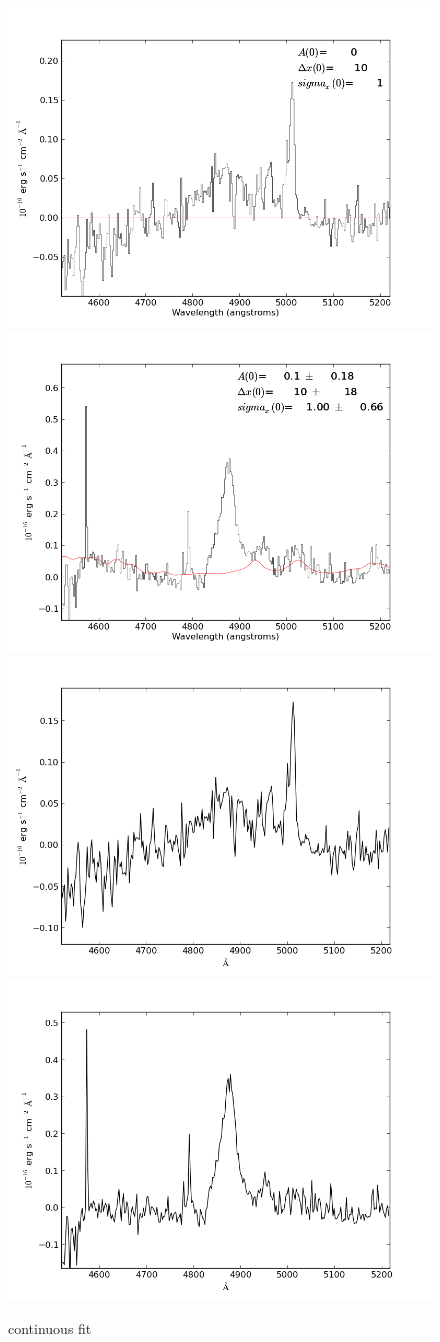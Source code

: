 \documentclass[usenatbib]{mn2e}
\begin{document}
\newpage

\begin{figure}
\begin{center}
\includegraphics[width=0.46\linewidth,angle=0]{fe_fit_Hbeta_8.png}
\vspace{5mm}
\includegraphics[width=0.49\linewidth,angle=0]{fe_fit_Hbeta_9.png}\\
\includegraphics[width=0.46\linewidth,angle=0]{fe_fit_Hbeta_res_8.png}
\hspace{5mm}
\includegraphics[width=0.49\linewidth,angle=0]{fe_fit_Hbeta_res_9.png}\\
\end{center} 
\caption{continuous fit \label{fig:landscape}}   
\end{figure}
\end{document}
